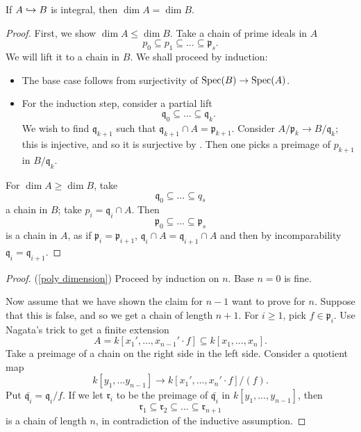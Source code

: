 \begin{prop}
  If $A \hookrightarrow B$ is integral, then $\dim A = \dim B$.
\end{prop}
\begin{proof}
  First, we show $\dim A \leq \dim B$.
  Take a chain of prime ideals in $A$
  \[ p_0 \subseteq p_1 \subseteq \dotso \subseteq \mathfrak p_s.\]
  We will lift it to a chain in $B$. We shall proceed by induction:
  \begin{itemize}
  \item The base case follows from surjectivity of $\text{Spec}(B) \to \text{Spec}(A)$.
  \item For the induction step, consider a partial lift
    \[ \mathfrak q_0 \subseteq \dotso \subseteq \mathfrak q_k.\]
    We wish to find $\mathfrak q_{k+1}$ such that $\mathfrak q_{k+1} \cap A = \mathfrak p_{k+1}$.
    Consider $A/{\mathfrak p_k} \to B/{\mathfrak q_k}$; this is injective, and so it is surjective by
    .
    Then one picks a preimage of $p_{k+1}$ in $B/{\mathfrak q_k}$.
  \end{itemize}
  For $\dim A \geq \dim B$, take
  \[ \mathfrak q_0 \subseteq \dotso \subseteq q_s\]
  a chain in $B$; take $p_i = \mathfrak q_i \cap A$. Then
  \[ \mathfrak p_0 \subseteq \dotso \subseteq \mathfrak p_s\]
  is a chain in $A$, as if $\mathfrak p_i = \mathfrak p_{i+1}$, $\mathfrak q_i \cap A = \mathfrak q_{i+1} \cap A$ and then by incomparability
  $\mathfrak q_i = \mathfrak q_{i+1}$.
\end{proof}

\begin{proof}(\cref{poly dimension})
  Proceed by induction on $n$. Base $n=0$ is fine.

  Now assume that we have shown the claim for $n-1$ want to prove for $n$. Suppose that this is false, and so we get a chain of length $n+1$. For $i \geq 1$, pick $f \in \mathfrak p_i$.
  Use Nagata's trick to get a finite extension
  \[ A = k[x_1', \dotsc, x_{n-1}' \cdot f] \subseteq k[x_1, \dotsc, x_n].\]
  Take a preimage of a chain on the right side in the left side.
  Consider a quotient map
  \[ k[y_1, \dotsc y_{n-1}] \to k[x_1', \dotsc, x_n' \cdot f]/{(f)}.\]
  Put $\bar{\mathfrak q_i} = \mathfrak q_i /{f}$.
  If we let $\mathfrak r_i$ to be the preimage of $\bar{\mathfrak q_i}$ in $k[y_1, \dotsc, y_{n-1}]$, then
  \[ \mathfrak r_1 \subseteq \mathfrak r_2 \subseteq \dotso \subseteq \mathfrak r_{n+1}\]
  is a chain of length $n$, in contradiction of the inductive assumption.
\end{proof}


